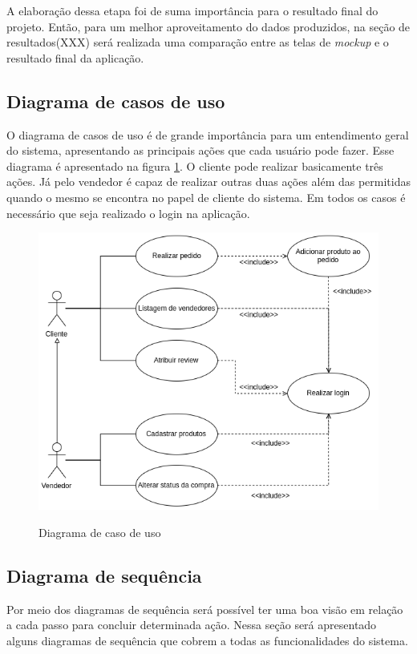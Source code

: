 A elaboração dessa etapa foi de suma importância para o resultado final do projeto. Então, para um melhor aproveitamento do dados produzidos, na seção de resultados(XXX) será realizada uma comparação entre as telas de \textit{mockup} e o resultado final da aplicação.

\subsection{Diagrama de casos de uso}
O diagrama de casos de uso é de grande importância para um entendimento geral do sistema, apresentando as principais ações que cada usuário pode fazer. Esse diagrama é apresentado na figura \ref{fig:use}. O cliente pode realizar basicamente três ações. Já pelo vendedor é capaz de realizar outras duas ações além das permitidas quando o mesmo se encontra no papel de cliente do sistema. Em todos os casos é necessário que seja realizado o login na aplicação.
\begin{figure}[htbp!]
  \centering
  \caption{Diagrama de caso de uso}
  \includegraphics[width=1\textwidth]{figs/caso_de_uso.png}
    \label{fig:use}
\end{figure}


\subsection{Diagrama de sequência}
Por meio dos diagramas de sequência será possível ter uma boa visão em relação a cada passo para concluir determinada ação. Nessa seção será apresentado alguns diagramas de sequência que cobrem a todas as funcionalidades do sistema.

